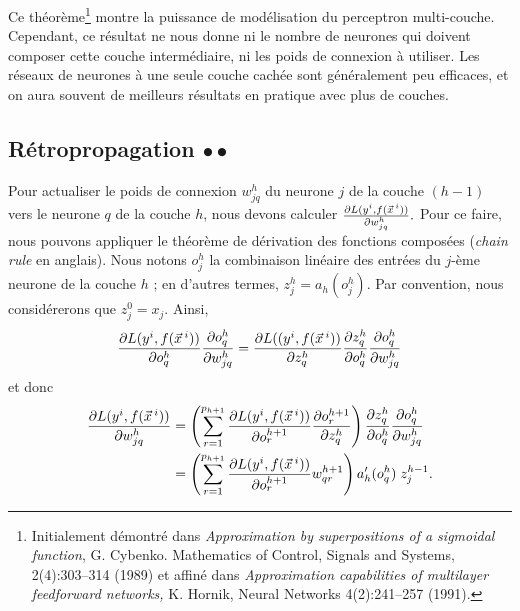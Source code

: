   
Ce théorème\footnote{Initialement démontré dans \textit{Approximation by
    superpositions of a sigmoidal function}, G. Cybenko. Mathematics of
  Control, Signals and Systems, 2(4):303--314 (1989) et affiné dans
  \textit{Approximation capabilities of multilayer feedforward networks,}
  K. Hornik, Neural Networks 4(2):241--257 (1991).}  montre la puissance de
modélisation du perceptron multi-couche. Cependant, ce résultat ne nous donne
ni le nombre de neurones qui doivent composer cette couche intermédiaire, ni
les poids de connexion à utiliser. Les réseaux de neurones à une seule couche
cachée sont généralement peu efficaces, et on aura souvent de meilleurs
résultats en pratique avec plus de couches.


\subsection{Rétropropagation $\bullet \bullet$}
\label{sec:backprop}
Pour actualiser le poids de connexion $w^h_{jq}$ du neurone $j$ de la couche
$(h-1)$ vers le neurone $q$ de la couche $h$, nous devons calculer
$\frac{\partial L(y^i, f(\xx^i))}{\partial w^h_{jq}}.$ Pour ce faire, nous
pouvons appliquer le théorème de dérivation des fonctions composées ({\it chain
  rule} en anglais). Nous notons $o^h_j$ la combinaison linéaire des entrées du
$j$-ème neurone de la couche $h$ ; en d'autres termes, $z^h_j =
a_h(o^h_j)$. Par convention, nous considérerons que $z^0_j = x_j$. Ainsi,
\begin{equation}
  \label{eq:mlp_gradient}
  \frac{\partial L(y^i, f(\xx^i))}{\partial o^h_q} 
  \frac{\partial o^h_q}{\partial w^h_{jq}} 
  = \frac{\partial L((y^i, f(\xx^i))}{\partial z^h_q} 
  \frac{\partial z^h_q}{\partial o^h_q} 
  \frac{\partial o^h_q}{\partial w^h_{jq}}   
\end{equation}
et donc   
\begin{equation}
  \begin{split}
    \frac{\partial L(y^i, f(\xx^i))}{\partial w^h_{jq}} & =
    \left(\sum_{r=1}^{p_{h+1}}  \frac{\partial L(y^i, f(\xx^i))}{\partial o^{h+1}_r}  
      \frac{\partial o^{h+1}_r}{\partial z^h_q} \right)
    \frac{\partial z^h_q}{\partial o^h_q} 
    \frac{\partial o^h_q}{\partial w^h_{jq}} \\
    & = \left(\sum_{r=1}^{p_{h+1}}  \frac{\partial L(y^i, f(\xx^i))}{\partial o^{h+1}_r}  
      w^{h+1}_{qr} \right) a_h'(o^h_q) \; z^{h-1}_j.    
  \end{split}
\end{equation}

